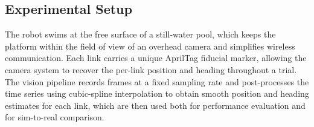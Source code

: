 \begin{table}[t]
\centering
\caption{Bill of materials for SwimGym eel robot (2-link).}
\label{tab:eel_bom}
\renewcommand{\arraystretch}{1.15}
\end{table}

\subsection{Experimental Setup}

The robot swims at the free surface of a still-water pool, which keeps the platform within the field of view of an overhead camera and simplifies wireless communication. Each link carries a unique AprilTag fiducial marker, allowing the camera system to recover the per-link position and heading throughout a trial. The vision pipeline records frames at a fixed sampling rate and post-processes the time series using cubic-spline interpolation to obtain smooth position and heading estimates for each link, which are then used both for performance evaluation and for sim-to-real comparison.

